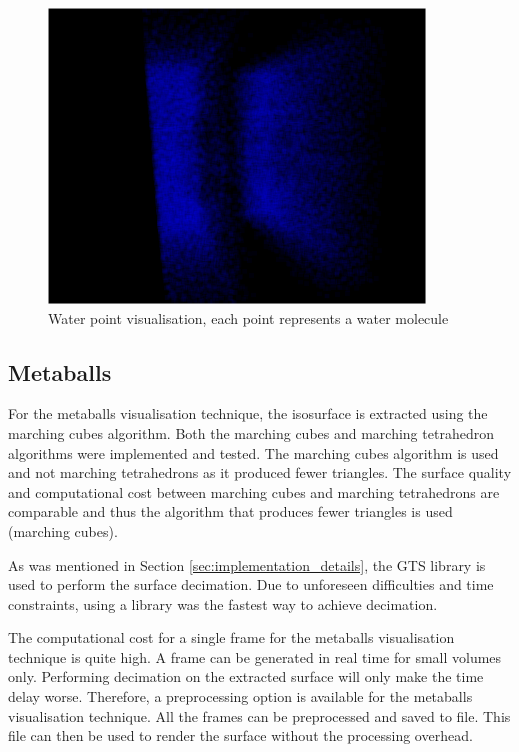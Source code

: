 \begin{figure}[h!]
  \begin{center}
    \includegraphics[width=100mm]{waterpoint}
  \end{center}
  \caption{Water point visualisation, each point represents a water molecule}
  \label{fig:implementation_waterpoint}
\end{figure}


\subsection{Metaballs}
\label{sub:implementation_metaballs}

For the metaballs visualisation technique, the isosurface is extracted using
the marching cubes algorithm. Both the marching cubes and marching tetrahedron
algorithms were implemented and tested. The marching cubes algorithm is used
and not marching tetrahedrons as it produced fewer triangles. The surface
quality and computational cost between marching cubes and marching tetrahedrons
are comparable and thus the algorithm that produces fewer triangles is used
(marching cubes).

As was mentioned in Section \ref{sec:implementation_details}, the GTS library
is used to perform the surface decimation. Due to unforeseen difficulties and
time constraints, using a library was the fastest way to achieve decimation.

The computational cost for a single frame for the metaballs visualisation
technique is quite high. A frame can be generated in real time for small
volumes only. Performing decimation on the extracted surface will only make the
time delay worse. Therefore, a preprocessing option is available for the
metaballs visualisation technique. All the frames can be preprocessed and saved
to file. This file can then be used to render the surface without the
processing overhead.

